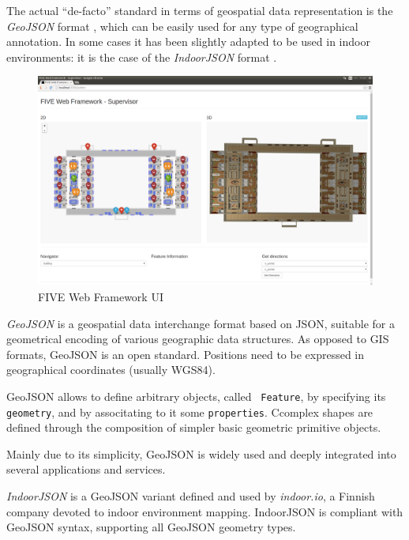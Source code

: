 The actual ``de-facto'' standard in terms of geospatial data representation is
the \emph{GeoJSON} format \cite{geojson}, which can be easily used for any type of geographical
annotation. In some cases it has been slightly adapted to be used in indoor
environments: it is the case of the \emph{IndoorJSON} format \cite{indoorjson}.



\begin{figure}[t!]
\centering
\includegraphics[width=\textwidth]{images/framework-ui.png}
\caption{FIVE Web Framework UI}
\label{fig:web-framework-ui}
\end{figure}




\emph{GeoJSON} is a geospatial data interchange format based on JSON, suitable for a
geometrical encoding of various geographic data structures. As opposed to GIS
formats, GeoJSON is an open standard. Positions need to be expressed in
geographical coordinates (usually WGS84).

GeoJSON \cite{geojson} allows to define arbitrary objects, called {\tt
Feature}, by specifying its {\tt geometry}, and by associtating to it some
{\tt properties}. Ccomplex shapes are defined through the composition of
simpler  basic geometric primitive objects. 

Mainly due to its simplicity,
GeoJSON is widely used and deeply integrated into several applications and
services.

\emph{IndoorJSON} \cite{indoorjson} is a GeoJSON variant defined and used by \emph{indoor.io}, a
Finnish company devoted to indoor environment mapping. IndoorJSON is compliant
with GeoJSON syntax, supporting all GeoJSON geometry types.

